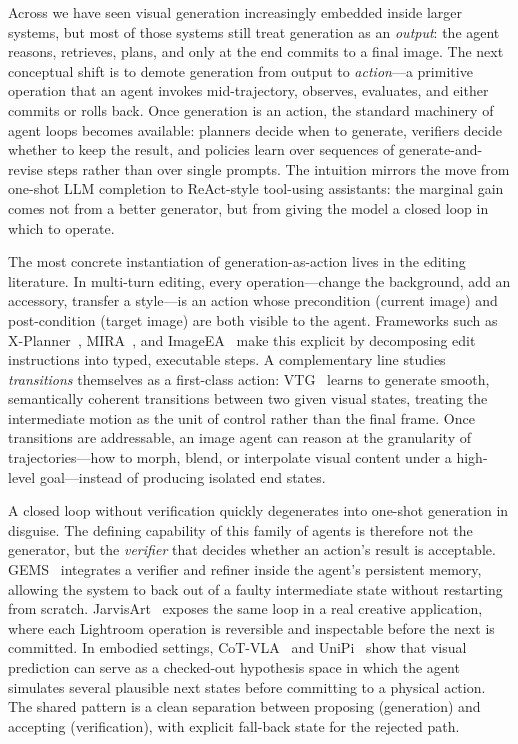 \documentclass{llmxive}
\begin{document}
Across  we have seen visual generation increasingly embedded inside larger systems, but most of those systems still treat generation as an \emph{output}: the agent reasons, retrieves, plans, and only at the end commits to a final image. The next conceptual shift is to demote generation from output to \emph{action}---a primitive operation that an agent invokes mid-trajectory, observes, evaluates, and either commits or rolls back. Once generation is an action, the standard machinery of agent loops becomes available: planners decide when to generate, verifiers decide whether to keep the result, and policies learn over sequences of generate-and-revise steps rather than over single prompts. The intuition mirrors the move from one-shot LLM completion to ReAct-style tool-using assistants: the marginal gain comes not from a better generator, but from giving the model a closed loop in which to operate.

The most concrete instantiation of generation-as-action lives in the editing literature. In multi-turn editing, every operation---change the background, add an accessory, transfer a style---is an action whose precondition (current image) and post-condition (target image) are both visible to the agent. Frameworks such as X-Planner~\citep{Yeh2025BeyondSE}, MIRA~\citep{Zeng2025MIRAMI}, and ImageEA~\citep{Hu2025ImageEA} make this explicit by decomposing edit instructions into typed, executable steps. A complementary line studies \emph{transitions} themselves as a first-class action: VTG~\citep{yang2025vtg} learns to generate smooth, semantically coherent transitions between two given visual states, treating the intermediate motion as the unit of control rather than the final frame. Once transitions are addressable, an image agent can reason at the granularity of trajectories---how to morph, blend, or interpolate visual content under a high-level goal---instead of producing isolated end states.

A closed loop without verification quickly degenerates into one-shot generation in disguise. The defining capability of this family of agents is therefore not the generator, but the \emph{verifier} that decides whether an action's result is acceptable. GEMS~\citep{he2026gems} integrates a verifier and refiner inside the agent's persistent memory, allowing the system to back out of a faulty intermediate state without restarting from scratch. JarvisArt~\citep{lin2025jarvisart} exposes the same loop in a real creative application, where each Lightroom operation is reversible and inspectable before the next is committed. In embodied settings, CoT-VLA~\citep{zhao2025cotvla} and UniPi~\citep{du2023unipi} show that visual prediction can serve as a checked-out hypothesis space in which the agent simulates several plausible next states before committing to a physical action. The shared pattern is a clean separation between proposing (generation) and accepting (verification), with explicit fall-back state for the rejected path.
\end{document}
